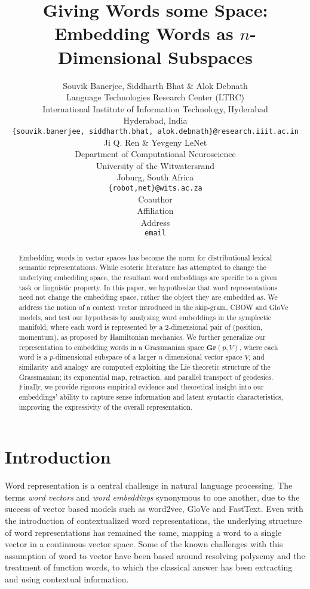 \documentclass{article} %
\title{Giving Words some Space: Embedding Words as $n$-Dimensional Subspaces}
\author{Souvik Banerjee, Siddharth Bhat \& Alok Debnath \\ %
Language Technologies Research Center (LTRC)\\
International Institute of Information Technology, Hyderabad\\
Hyderabad, India \\
\texttt{\{souvik.banerjee, siddharth.bhat, alok.debnath\}@research.iiit.ac.in} \\
\And
Ji Q. Ren \& Yevgeny LeNet \\
Department of Computational Neuroscience \\
University of the Witwatersrand \\
Joburg, South Africa \\
\texttt{\{robot,net\}@wits.ac.za} \\
\AND
Coauthor \\
Affiliation \\
Address \\
\texttt{email}
}
\begin{document}
\maketitle

\begin{abstract}
    Embedding words in vector spaces has become the norm for distributional lexical semantic representations. While esoteric literature has attempted to change the underlying embedding space, the resultant word embeddings are specific to a given task or linguistic property. In this paper, we hypothesize that word representations need not change the embedding space, rather the object they are embedded as. We address the notion of a context vector introduced in the skip-gram, CBOW and GloVe models, and test our hypothesis by analyzing word embeddings in the symplectic manifold, where each word is represented by a 2-dimensional pair of (position, momentum), as proposed by Hamiltonian mechanics. We further generalize our representation to embedding words in a Grassmanian space $\mathbf{Gr}(p, V)$, where each word is a $p$-dimensional subspace of a larger $n$ dimensional vector space $V$, and similarity and analogy are computed exploiting the Lie theoretic structure of the Grassmanian; its exponential map, retraction, and parallel transport of geodesics. Finally, we provide rigorous empirical evidence and theoretical insight into our embeddings' ability to capture sense information and latent syntactic characteristics, improving the expressivity of the overall representation.
\end{abstract}

\section{Introduction}
\label{sec: intro}

Word representation is a central challenge in natural language processing. The terms \emph{word vectors} and \emph{word embeddings} synonymous to one another, due to the success of vector based models such as word2vec, GloVe and FastText. Even with the introduction of contextualized word representations, the underlying structure of word representations has remained the same, mapping a word to a single vector in a continuous vector space. Some of the known challenges with this assumption of word to vector have been based around resolving polysemy and the treatment of function words, to which the classical answer has been extracting and using contextual information. 
\end{document}
